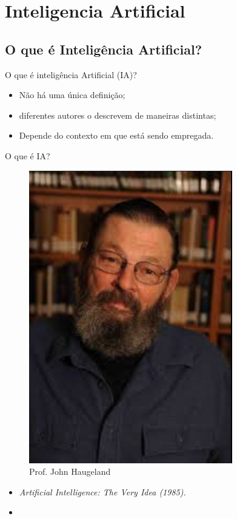 \section{Inteligencia Artificial}
\subsection{O que é Inteligência Artificial?}
\begin{frame}{O que é inteligência Artificial (IA)?}
    \begin{block}{}
        \begin{itemize}
            \item Não há uma única definição; 
            \item diferentes autores o descrevem de maneiras distintas;
            \item Depende do contexto em que está sendo empregada.
        \end{itemize}
    \end{block}
\end{frame}
\begin{frame}{O que é IA?}
    \begin{minipage}{0.5\linewidth}
        \begin{figure}
            \centering
            \includegraphics[width=0.6\linewidth]{imagens//secao1/haugeland1985.png}
            \caption{Prof. John Haugeland}
        \end{figure}
    \end{minipage}
    \begin{minipage}{0.5\linewidth}
        \begin{itemize}
        \justifying
            \item \textit{Artificial Intelligence: The Very Idea (1985).}
            \item {}
        \end{itemize}
    \end{minipage}
\end{frame}

